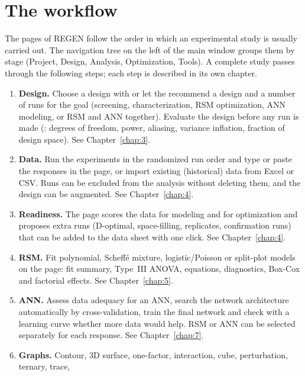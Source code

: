 \section{The workflow}
\label{sec:ch01-workflow}

The pages of REGEN follow the order in which an experimental study is usually carried out. The navigation tree on
the left of the main window groups them by stage (Project, Design, Analysis, Optimization, Tools). A complete study
passes through the following steps; each step is described in its own chapter.

\begin{enumerate}
  \item \textbf{Design.} Choose a design with  or let the  recommend a design and a
        number of runs for the goal (screening, characterization, RSM optimization, ANN modeling, or RSM and ANN
        together). Evaluate the design before any run is made (: degrees of freedom, power,
        aliasing, variance inflation, fraction of design space). See Chapter~\ref{chap:3}.
  \item \textbf{Data.} Run the experiments in the randomized run order and type or paste the responses in the
         page, or import existing (historical) data from Excel or CSV. Runs can be excluded from the
        analysis without deleting them, and the design can be augmented. See Chapter~\ref{chap:4}.
  \item \textbf{Readiness.} The  page scores the data for modeling and for optimization and
        proposes extra runs (D-optimal, space-filling, replicates, confirmation runs) that can be added to the data
        sheet with one click. See Chapter~\ref{chap:4}.
  \item \textbf{RSM.} Fit polynomial, Scheff\'e mixture, logistic/Poisson or split-plot models on the
         page: fit summary, Type~III ANOVA, equations, diagnostics, Box-Cox and factorial effects.
        See Chapter~\ref{chap:5}.
  \item \textbf{ANN.} Assess data adequacy for an ANN, search the network architecture automatically by
        cross-validation, train the final network and check with a learning curve whether more data would help.
        RSM or ANN can be selected separately for each response. See Chapter~\ref{chap:7}.
  \item \textbf{Graphs.} Contour, 3D surface, one-factor, interaction, cube, perturbation, ternary, trace,

\end{enumerate}
